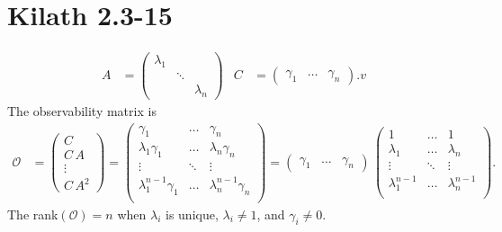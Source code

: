 \section{Kilath 2.3-15}
\begin{align*}
    A &= \begin{pmatrix} 
        \lambda_{1} &   &   \\
            & \ddots    &   \\
            &           & \lambda_{n}
        \end{pmatrix} & C &= \begin{pmatrix}
            \gamma_1 & \dots & \gamma_n
        \end{pmatrix}.v
\end{align*}
The observability matrix is 
\begin{align*}
    \mathcal{O} &= \begin{pmatrix}
        C \\
        C\,A \\
        \vdots \\
        C\,A^2
    \end{pmatrix} = \begin{pmatrix}
        \gamma_1 & \dots & \gamma_n \\
        \lambda_{1}\gamma_1 & \dots & \lambda_{n}\gamma_n \\
        \vdots & \ddots & \vdots \\
        \lambda_{1}^{n-1}\gamma_1 & \dots & \lambda_{n}^{n-1}\gamma_n \\
    \end{pmatrix} = \begin{pmatrix}
        \gamma_1 & \dots & \gamma_n
    \end{pmatrix}\,\begin{pmatrix}
        1 & \dots & 1 \\
        \lambda_{1} & \dots & \lambda_{n} \\
        \vdots & \ddots & \vdots \\
        \lambda_{1}^{n-1} & \dots & \lambda_{n}^{n-1} \\
    \end{pmatrix}.
\end{align*}
The rank$\left(\mathcal{O}\right) = n$ when $\lambda_i$ is unique, $\lambda_i \neq 1$, and $\gamma_i \neq 0$. 
